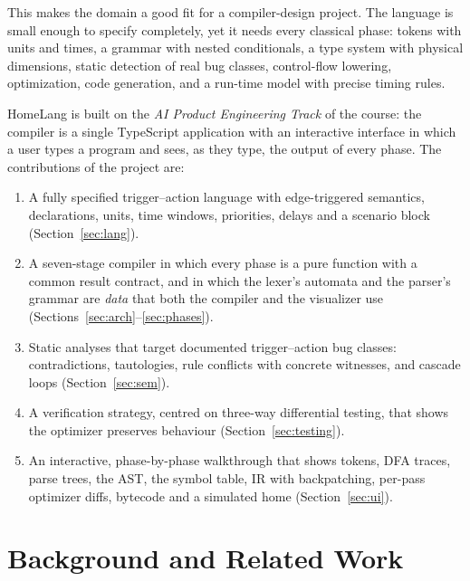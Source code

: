 \documentclass[conference]{IEEEtran}
\begin{document}
This makes the domain a good fit for a compiler-design project. The language is small enough to specify completely, yet it needs every classical phase: tokens with units and times, a grammar with nested conditionals, a type system with physical dimensions, static detection of real bug classes, control-flow lowering, optimization, code generation, and a run-time model with precise timing rules.

HomeLang is built on the \emph{AI Product Engineering Track} of the course: the compiler is a single TypeScript application with an interactive interface in which a user types a program and sees, as they type, the output of every phase. The contributions of the project are:
\begin{enumerate}
  \item A fully specified trigger--action language with edge-triggered semantics, declarations, units, time windows, priorities, delays and a scenario block (Section~\ref{sec:lang}).
  \item A seven-stage compiler in which every phase is a pure function with a common result contract, and in which the lexer's automata and the parser's grammar are \emph{data} that both the compiler and the visualizer use (Sections~\ref{sec:arch}--\ref{sec:phases}).
  \item Static analyses that target documented trigger--action bug classes: contradictions, tautologies, rule conflicts with concrete witnesses, and cascade loops (Section~\ref{sec:sem}).
  \item A verification strategy, centred on three-way differential testing, that shows the optimizer preserves behaviour (Section~\ref{sec:testing}).
  \item An interactive, phase-by-phase walkthrough that shows tokens, DFA traces, parse trees, the AST, the symbol table, IR with backpatching, per-pass optimizer diffs, bytecode and a simulated home (Section~\ref{sec:ui}).
\end{enumerate}

\section{Background and Related Work}
\end{document}

